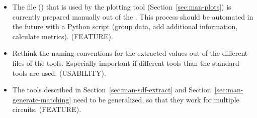 \begin{itemize}
	\item The file () that is used by the plotting tool 
	(Section~\ref{sec:man-plots}) is currently prepared manually out of the 
	. This process should be automated in the future with a 
	Python script (group data, add additional information, calculate metrics). 
	(FEATURE).
	
	\item Rethink the naming conventions for the extracted values out of the 
	different files of the tools. Especially important if different tools than 
	the standard tools are used. (USABILITY).
	
	\item The tools described in Section~\ref{sec:man-sdf-extract} and 
	Section~\ref{sec:man-generate-matching} need to be generalized, so that 
	they work for multiple circuits. (FEATURE).
\end{itemize}